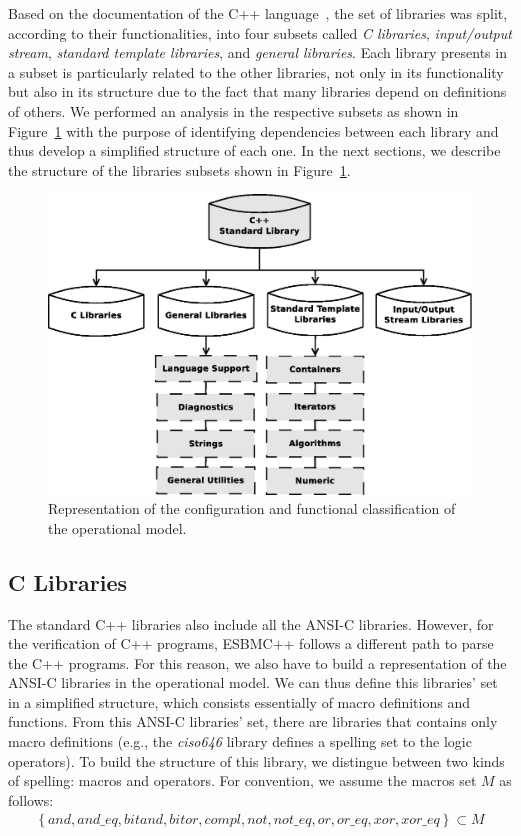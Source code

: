 \documentclass[a4paper]{llncs}
\begin{document}
Based on the documentation of the C++ language~\cite{CppReference12}, the set of libraries
was split, according to their functionalities, into four subsets called \textit{C libraries},
\textit{input/output stream}, \textit{standard template libraries}, and \textit{general libraries}.
Each library presents in a subset is particularly related to the other libraries, not only in its
functionality but also in its structure due to the fact that many libraries depend on
definitions of others. We performed an analysis in the respective subsets
as shown in Figure~\ref{figure:cpp-diagram} with the purpose of identifying dependencies
between each library and thus develop a simplified structure of each one. In the next sections,
we describe the structure of the libraries subsets shown in Figure~\ref{figure:cpp-diagram}.
%
\begin{figure}[ht]
\centering
\includegraphics[scale=0.28]{figures/diagramascpp}
\caption{Representation of the configuration and functional classification of the operational model.}
\label{figure:cpp-diagram}
\end{figure}

\subsection{C Libraries}

The standard C++ libraries also include all the ANSI-C libraries.
However, for the verification of C++ programs, ESBMC++
follows a different path to parse the C++ programs.
For this reason, we also have to build a representation
of the ANSI-C libraries in the operational model. We can thus
define this libraries' set in a simplified structure, which consists
essentially of macro definitions and functions. From this ANSI-C libraries' set,
there are libraries that contains only macro definitions (e.g., the \textit{ciso646} library
defines a spelling set to the logic operators). To build the structure of this
library, we distingue between two kinds of spelling: macros and operators.
For convention, we assume the macros set $M$ as follows:
%
\begin{eqnarray}
\label{ciso646-macro-set}
\left\{and, and\_eq, bitand, bitor, compl, not, not\_eq, or, or\_eq, xor, xor\_eq\right\} \subset M
\end{eqnarray}
\end{document}
